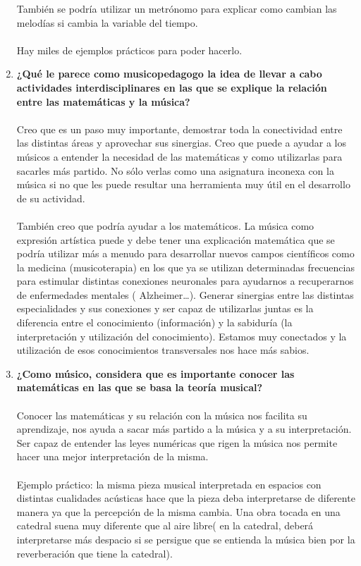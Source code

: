 \documentclass[a4paper, openright, 11pt, titlepage]{report}
\theoremstyle{definition}\newtheorem{defin}[propo]{Definition}
\theoremstyle{definition}\newtheorem{obser}[propo]{Remark}
\theoremstyle{definition}\newtheorem{ejem}[propo]{Ejemplo}
\theoremstyle{definition}\newtheorem{algoritmo}[propo]{Algoritmo}
\begin{document}
\begin{enumerate}
    También se podría utilizar un metrónomo para explicar como cambian las melodías si cambia la variable del tiempo.\\\\
    Hay miles de ejemplos prácticos para poder hacerlo.
    \item \textbf{¿Qué le parece como musicopedagogo la idea de llevar a cabo actividades interdisciplinares en las que se explique la relación entre las matemáticas y la música?}\\\\
    Creo que es un paso muy importante, demostrar toda la conectividad entre las distintas áreas y aprovechar sus sinergias. Creo que puede a ayudar a los músicos a entender la necesidad de las matemáticas y como utilizarlas para sacarles más partido. No sólo verlas como una asignatura inconexa con la música si no que les puede resultar una herramienta muy útil en el desarrollo de su actividad.\\\\
    También creo que podría ayudar a los matemáticos. La música como expresión artística puede y debe tener una explicación matemática que se podría utilizar más a menudo para desarrollar nuevos campos científicos como la medicina (musicoterapia) en los que ya se utilizan determinadas frecuencias para estimular distintas conexiones neuronales para ayudarnos a recuperarnos de enfermedades mentales ( Alzheimer…). Generar sinergias entre las distintas especialidades y sus conexiones y ser capaz de utilizarlas juntas es la diferencia entre el conocimiento (información) y la sabiduría  (la interpretación y utilización del conocimiento). Estamos muy conectados y la utilización de esos conocimientos transversales nos hace más sabios.
    \item \textbf{¿Como músico, considera que es importante conocer las matemáticas en las que se basa la teoría musical?}\\\\
    Conocer las matemáticas y su relación con la música nos facilita su aprendizaje, nos ayuda a sacar más partido a la música y a su interpretación. Ser capaz de entender las leyes numéricas que rigen la música nos permite hacer una mejor interpretación de la misma.\\\\
    Ejemplo práctico: la misma pieza musical interpretada en espacios con distintas cualidades acústicas hace que la pieza deba interpretarse de diferente manera ya que la percepción de la misma cambia. 
    Una obra tocada en una catedral suena muy diferente que al aire libre( en la catedral, deberá interpretarse más despacio si se persigue que se entienda la música bien por la reverberación que tiene la catedral).\\

\end{enumerate}
\end{document}
